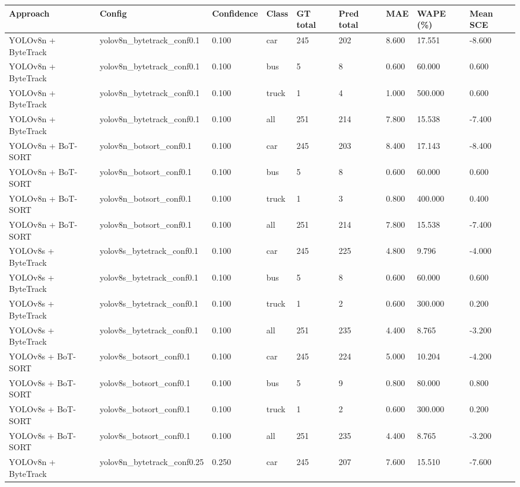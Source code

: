 \begin{tabular}{lllllllll}
\toprule
Approach & Config & Confidence & Class & GT total & Pred total & MAE & WAPE (\%) & Mean SCE \\
\midrule
YOLOv8n + ByteTrack & yolov8n\_bytetrack\_conf0.1 & 0.100 & car & 245 & 202 & 8.600 & 17.551 & -8.600 \\
YOLOv8n + ByteTrack & yolov8n\_bytetrack\_conf0.1 & 0.100 & bus & 5 & 8 & 0.600 & 60.000 & 0.600 \\
YOLOv8n + ByteTrack & yolov8n\_bytetrack\_conf0.1 & 0.100 & truck & 1 & 4 & 1.000 & 500.000 & 0.600 \\
YOLOv8n + ByteTrack & yolov8n\_bytetrack\_conf0.1 & 0.100 & all & 251 & 214 & 7.800 & 15.538 & -7.400 \\
YOLOv8n + BoT-SORT & yolov8n\_botsort\_conf0.1 & 0.100 & car & 245 & 203 & 8.400 & 17.143 & -8.400 \\
YOLOv8n + BoT-SORT & yolov8n\_botsort\_conf0.1 & 0.100 & bus & 5 & 8 & 0.600 & 60.000 & 0.600 \\
YOLOv8n + BoT-SORT & yolov8n\_botsort\_conf0.1 & 0.100 & truck & 1 & 3 & 0.800 & 400.000 & 0.400 \\
YOLOv8n + BoT-SORT & yolov8n\_botsort\_conf0.1 & 0.100 & all & 251 & 214 & 7.800 & 15.538 & -7.400 \\
YOLOv8s + ByteTrack & yolov8s\_bytetrack\_conf0.1 & 0.100 & car & 245 & 225 & 4.800 & 9.796 & -4.000 \\
YOLOv8s + ByteTrack & yolov8s\_bytetrack\_conf0.1 & 0.100 & bus & 5 & 8 & 0.600 & 60.000 & 0.600 \\
YOLOv8s + ByteTrack & yolov8s\_bytetrack\_conf0.1 & 0.100 & truck & 1 & 2 & 0.600 & 300.000 & 0.200 \\
YOLOv8s + ByteTrack & yolov8s\_bytetrack\_conf0.1 & 0.100 & all & 251 & 235 & 4.400 & 8.765 & -3.200 \\
YOLOv8s + BoT-SORT & yolov8s\_botsort\_conf0.1 & 0.100 & car & 245 & 224 & 5.000 & 10.204 & -4.200 \\
YOLOv8s + BoT-SORT & yolov8s\_botsort\_conf0.1 & 0.100 & bus & 5 & 9 & 0.800 & 80.000 & 0.800 \\
YOLOv8s + BoT-SORT & yolov8s\_botsort\_conf0.1 & 0.100 & truck & 1 & 2 & 0.600 & 300.000 & 0.200 \\
YOLOv8s + BoT-SORT & yolov8s\_botsort\_conf0.1 & 0.100 & all & 251 & 235 & 4.400 & 8.765 & -3.200 \\
YOLOv8n + ByteTrack & yolov8n\_bytetrack\_conf0.25 & 0.250 & car & 245 & 207 & 7.600 & 15.510 & -7.600 \\

\end{tabular}

